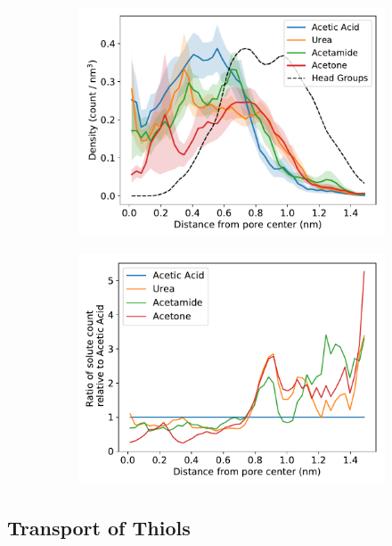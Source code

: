 \documentclass{article}
\begin{document}
  \begin{figure}[!htb]
  \centering
  \begin{subfigure}{0.45\textwidth}
  \includegraphics[width=\textwidth]{ketone_rdf.pdf}
  \caption{}\label{fig:ketones_rdf}
  \end{subfigure}
  \begin{subfigure}{0.45\textwidth}
  \includegraphics[width=\textwidth]{ketone_ratio.pdf}
  \caption{}\label{fig:ketones_ratio}
  \end{subfigure}
  \end{figure}
  
  \subsection*{Transport of Thiols}
  
\end{document}
